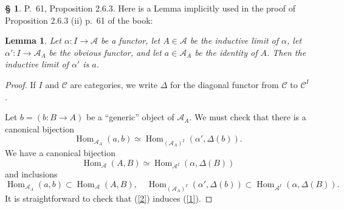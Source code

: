 \documentclass[12pt]{article}%
\newtheorem{lem}[thm]{Lemma}
\theoremstyle{remark}
\theoremstyle{definition}
\newtheorem{s}[thm]{\S}%
\newcommand{\A}{\mathcal A}
\newcommand{\C}{\mathcal C}
\DeclareMathOperator{\Hom}{Hom}%
\begin{document}

\begin{s} 
P.~61, Proposition 2.6.3. Here is a Lemma implicitly used in the proof of Proposition 2.6.3 (ii) p.~61 of the book: 

\begin{lem} 
Let $\alpha:I\to\A$ be a functor, let $A\in\A$ be the inductive limit of $\alpha$, let $\alpha':I\to\A_A$ be the obvious functor, and let $a\in\A_A$ be the identity of $A$. Then the inductive limit of $\alpha'$ is $a$. 
\end{lem} 

\begin{proof}
If $I$ and $\C$ are categories, we write $\Delta$ for the diagonal functor from $\C$ to $\C^I$. 

Let $b=(b:B\to A)$ be a ``generic'' object of $\A_A$. We must check that there is a canonical bijection
%
\begin{equation}\label{1}
\Hom_{\A_A}(a,b)\simeq\Hom_{(\A_A)^I}(\alpha',\Delta(b)).
\end{equation}
%
We have a canonical bijection
%
\begin{equation}\label{2}
\Hom_\A(A,B)\simeq\Hom_{\A^I}(\alpha,\Delta(B))
\end{equation}
%
and inclusions 
$$
\Hom_{\A_A}(a,b)\subset\Hom_\A(A,B),\quad
%
\Hom_{(\A_A)^I}(\alpha',\Delta(b))\subset\Hom_{\A^I}(\alpha,\Delta(B)).
$$
It is straightforward to check that (\ref{2}) induces (\ref{1}).
\end{proof}
\end{s}

%
\end{document}
